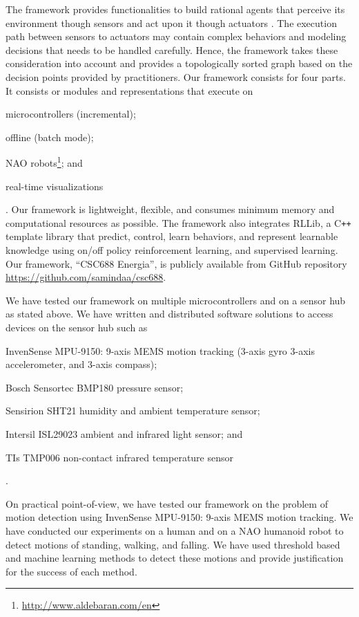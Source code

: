\documentclass{llncs}
\begin{document}
\begin{sloppy}
The framework provides functionalities to build  rational agents that perceive its
environment though sensors and act upon it though actuators \cite{russel2009}. The execution path
between sensors to actuators may contain complex behaviors and modeling decisions that needs to be
handled carefully. Hence, the framework takes these consideration into account and provides a
topologically sorted graph based on the decision points provided by practitioners. Our
framework consists for four parts. It consists or modules and representations that execute on
\begin{inparaenum}[(1)]\item microcontrollers (incremental); \item offline (batch mode); \item NAO
robots\footnote{\url{http://www.aldebaran.com/en}}; and \item real-time
visualizations\end{inparaenum}. Our framework is lightweight, flexible, and consumes minimum memory
and computational resources as
possible. The framework also integrates RLLib, a C\texttt{++} template library that predict,
control, learn behaviors, and represent learnable knowledge using on/off policy reinforcement
learning, and supervised learning. Our framework, ``CSC688 Energia'', is publicly available from
GitHub repository \url{https://github.com/samindaa/csc688}.

We have tested our framework on multiple microcontrollers and on a sensor hub as stated above. We
have written and distributed software solutions to access devices on the sensor hub such as
\begin{inparaenum}[(1)] \item InvenSense MPU-9150: 9-axis MEMS motion tracking (3-axis gyro
3-axis accelerometer, and 3-axis compass); \item Bosch Sensortec BMP180 pressure sensor; \item
Sensirion SHT21 humidity and ambient temperature sensor; \item Intersil ISL29023 ambient and
infrared light sensor; and \item TIs TMP006 non-contact infrared temperature sensor\end{inparaenum}.

On practical point-of-view, we have tested our framework on the problem of motion detection using
InvenSense MPU-9150: 9-axis MEMS motion tracking. We have conducted our experiments on a human
and on a NAO humanoid robot to detect motions of standing, walking, and falling. We have used
threshold based and machine learning methods to detect these motions and provide justification
for the success of each method.   



\end{sloppy}
\end{document}
